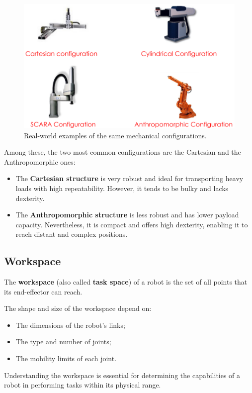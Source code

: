 \begin{figure}[H]
  \centering
  \includegraphics[width=0.8\linewidth]{imgs/mechanical_structures_real.png}
  \caption{Real-world examples of the same mechanical configurations.}
\end{figure}

Among these, the two most common configurations are the Cartesian and the Anthropomorphic ones:

\begin{itemize}
  \item The \textbf{Cartesian structure} is very robust and ideal for transporting heavy loads with high repeatability. However, it tends to be bulky and lacks dexterity.
  \item The \textbf{Anthropomorphic structure} is less robust and has lower payload capacity. Nevertheless, it is compact and offers high dexterity, enabling it to reach distant and complex positions.
\end{itemize}

\hfill

\subsection{Workspace}

The \textbf{workspace} (also called \textbf{task space}) of a robot is the set of all points that its end-effector can reach.

The shape and size of the workspace depend on:
\begin{itemize}
  \item The dimensions of the robot's links;
  \item The type and number of joints;
  \item The mobility limits of each joint.
\end{itemize}

Understanding the workspace is essential for determining the capabilities of a robot in performing tasks within its physical range.

